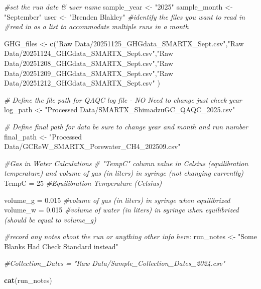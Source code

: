 \documentclass[
]{article}
\newenvironment{Shaded}{\begin{snugshade}}{\end{snugshade}}
\newcommand{\CommentTok}[1]{\textcolor[rgb]{0.56,0.35,0.01}{\textit{#1}}}
\newcommand{\DecValTok}[1]{\textcolor[rgb]{0.00,0.00,0.81}{#1}}
\newcommand{\FloatTok}[1]{\textcolor[rgb]{0.00,0.00,0.81}{#1}}
\newcommand{\FunctionTok}[1]{\textcolor[rgb]{0.13,0.29,0.53}{\textbf{#1}}}
\newcommand{\NormalTok}[1]{#1}
\newcommand{\OtherTok}[1]{\textcolor[rgb]{0.56,0.35,0.01}{#1}}
\newcommand{\StringTok}[1]{\textcolor[rgb]{0.31,0.60,0.02}{#1}}
\begin{document}
\begin{Shaded}
\begin{Highlighting}[]
\CommentTok{\#set the run date \& user name}
\NormalTok{sample\_year }\OtherTok{\textless{}{-}} \StringTok{"2025"}
\NormalTok{sample\_month }\OtherTok{\textless{}{-}} \StringTok{"September"}
\NormalTok{user }\OtherTok{\textless{}{-}} \StringTok{"Brenden Blakley"}
\CommentTok{\#identify the files you want to read in}
\CommentTok{\#read in as a list to accommodate multiple runs in a month}

\NormalTok{GHG\_files }\OtherTok{\textless{}{-}} \FunctionTok{c}\NormalTok{(}\StringTok{"Raw Data/20251125\_GHGdata\_SMARTX\_Sept.csv"}\NormalTok{,}\StringTok{"Raw Data/20251124\_GHGdata\_SMARTX\_Sept.csv"}\NormalTok{,}\StringTok{"Raw Data/20251208\_GHGdata\_SMARTX\_Sept.csv"}\NormalTok{,}\StringTok{"Raw Data/20251209\_GHGdata\_SMARTX\_Sept.csv"}\NormalTok{,}\StringTok{"Raw Data/20251212\_GHGdata\_SMARTX\_Sept.csv"}\NormalTok{ )}


\CommentTok{\# Define the file path for QAQC log file {-} NO Need to change just check year}
\NormalTok{log\_path }\OtherTok{\textless{}{-}} \StringTok{"Processed Data/SMARTX\_ShimadzuGC\_QAQC\_2025.csv"}


\CommentTok{\# Define final path for data be sure to change year and month and run number}
\NormalTok{final\_path }\OtherTok{\textless{}{-}} \StringTok{"Processed Data/GCReW\_SMARTX\_Porewater\_CH4\_202509.csv"}

\CommentTok{\#Gas in Water Calculations}
\CommentTok{\# "TempC" column value in Celsius (equilibration temperature) and volume of gas (in liters) in syringe (not changing currently)}
\NormalTok{TempC }\OtherTok{=} \DecValTok{25} \CommentTok{\#Equilibration Temperature (Celsius)}

\NormalTok{volume\_g }\OtherTok{=} \FloatTok{0.015} \CommentTok{\#volume of gas (in liters) in syringe when equilibrized}
\NormalTok{volume\_w }\OtherTok{=} \FloatTok{0.015} \CommentTok{\#volume of water (in liters) in syringe when equilibrized (should be equal to volume\_g)}

\CommentTok{\#record any notes about the run or anything other info here:}
\NormalTok{run\_notes }\OtherTok{\textless{}{-}} \StringTok{"Some Blanks Had Check Standard instead"}

\CommentTok{\#Collection\_Dates = "Raw Data/Sample\_Collection\_Dates\_2024.csv"}

\FunctionTok{cat}\NormalTok{(run\_notes)}
\end{Highlighting}
\end{Shaded}
\end{document}
